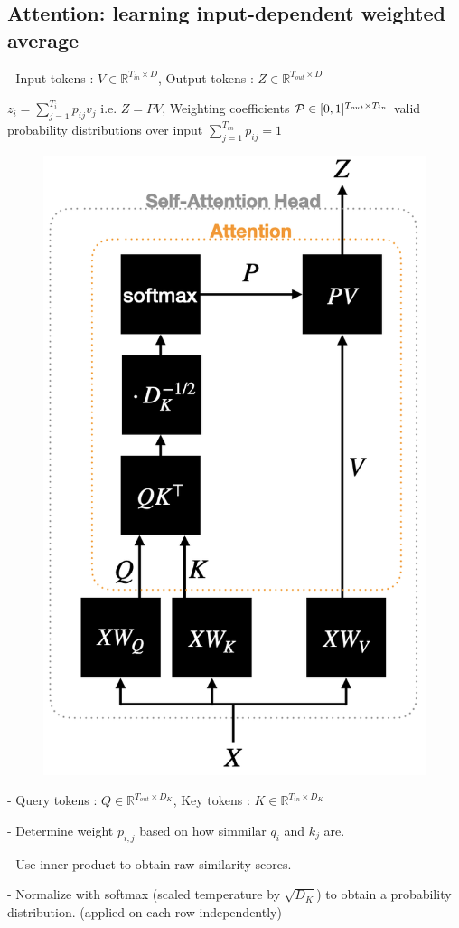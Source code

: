 \subsection*{Attention: learning input-dependent weighted average}




- Input tokens : $V\in\mathbb{R}^{T_{i n}\times D}$, Output tokens : $Z\in\mathbb{R}^{T_{out}\times D}$

$z_{i}=\sum_{j=1}^{T_{i}}p_{i j}v_{j}$ i.e. $Z=P V$, Weighting coefficients ${\cal P}\in[0,1]^{T_{out}\times T_{i n}}$ valid probability distributions over input $\textstyle\sum_{j=1}^{T_{i n}}p_{i j}=1$


\begin{figure}
  \includegraphics[width=0.4\columnwidth]{figures/self_attention.png}
\end{figure}

- Query tokens : $Q\in\mathbb{R}^{T_{out}\times D_{K}}$, Key tokens : $K\in\mathbb{R}^{T_{in}\times D_{K}}$


- Determine weight $p_{i,j}$ based on how simmilar $q_i$ and $k_j$ are.

- Use inner product to obtain raw similarity scores.

- Normalize with softmax (scaled temperature by $\sqrt{D_{K}}$) to obtain a probability distribution. (applied on each row independently)

